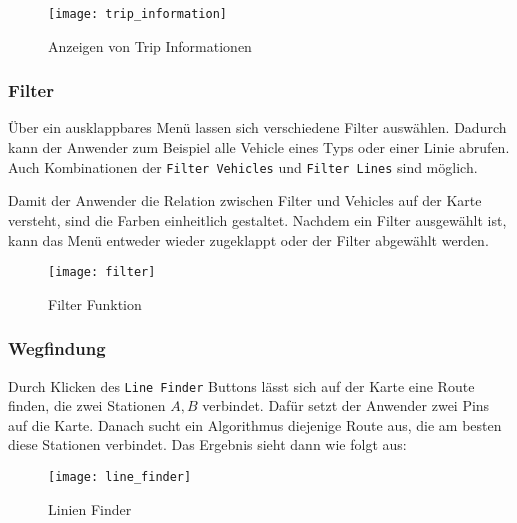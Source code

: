     \begin{figure}[htbp]
      \begin{center}
        \texttt{[image: trip\_information]}
        \caption{Anzeigen von Trip Informationen}
        \label{fig:trip_information}
      \end{center}
    \end{figure}
    

  \subsubsection*{Filter}
  \label{ssub:filter}
    Über ein ausklappbares Menü lassen sich verschiedene Filter auswählen. Dadurch kann der Anwender zum Beispiel alle Vehicle eines Typs oder einer Linie abrufen. Auch Kombinationen der \texttt{Filter Vehicles} und \texttt{Filter Lines} sind möglich.

    Damit der Anwender die Relation zwischen Filter und Vehicles auf der Karte versteht, sind die Farben einheitlich gestaltet. Nachdem ein Filter ausgewählt ist, kann das Menü entweder wieder zugeklappt oder der Filter abgewählt werden.

    \begin{figure}[htbp]
      \begin{center}
        \texttt{[image: filter]}
        \caption{Filter Funktion}
        \label{fig:filter}
      \end{center}
    \end{figure}
    

  \subsubsection*{Wegfindung}
  \label{ssub:wegfindung}
    Durch Klicken des \texttt{Line Finder} Buttons {\Large {}} lässt sich auf der Karte eine Route finden, die zwei Stationen $A, B$ verbindet. Dafür setzt der Anwender zwei Pins auf die Karte. Danach sucht ein Algorithmus diejenige Route aus, die am besten diese Stationen verbindet. Das Ergebnis sieht dann wie folgt aus:

    \begin{figure}[htbp]
      \begin{center}
        \texttt{[image: line\_finder]}
        \caption{Linien Finder}
        \label{fig:line_finder}
      \end{center}
    \end{figure}

